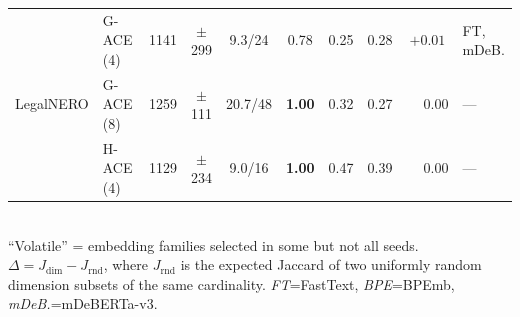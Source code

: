 \begin{table}[t]
{\begin{tabular}{@{}llr@{\,}ccccccl@{}}
\multirow{3}{*}{LegalNERO}
 & G-ACE\,(4) & 1141 & {\scriptsize$\pm$299} & 9.3/24  & 0.78          & 0.25 & 0.28 & $+0.01$ & FT, mDeB. \\
 & G-ACE\,(8) & 1259 & {\scriptsize$\pm$111} & 20.7/48 & \textbf{1.00} & 0.32 & 0.27 & $\phantom{-}0.00$ & --- \\
 & H-ACE\,(4) & 1129 & {\scriptsize$\pm$234} & 9.0/16  & \textbf{1.00} & 0.47 & 0.39 & $\phantom{-}0.00$ & --- \\
\bottomrule
\end{tabular}}
\vspace{2pt}\\
{\scriptsize ``Volatile'' = embedding families selected in some but not all seeds.
$\Delta = J_{\text{dim}} - J_{\text{rnd}}$, where $J_{\text{rnd}}$ is the expected
Jaccard of two uniformly random dimension subsets of the same cardinality.
\emph{FT}=FastText, \emph{BPE}=BPEmb, \emph{mDeB.}=mDeBERTa-v3.}
\end{table}
